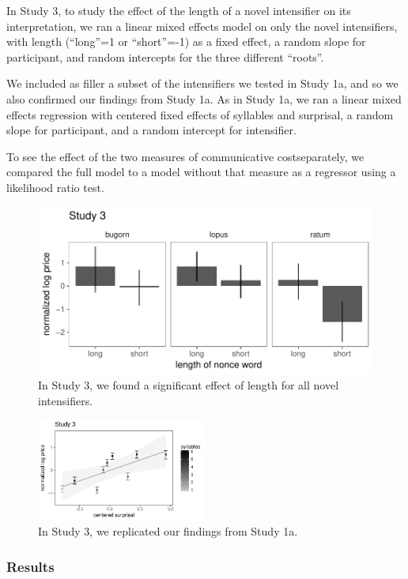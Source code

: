 \documentclass[10pt,letterpaper]{article}
\begin{document}
In Study 3,  to study the effect of the length of a novel intensifier on its interpretation, we ran a linear mixed effects model on only the novel intensifiers, with length (``long''=1 or ``short''=-1) as a fixed effect, a random slope for participant, and random intercepts for the three different ``roots''.

We included as filler a subset of the intensifiers we tested in Study 1a, and so we also confirmed our findings from Study 1a.
As in Study 1a, we ran a linear mixed effects regression with centered fixed effects of syllables and surprisal, a random slope for participant, and a random intercept for intensifier.

To see the effect of the two measures of communicative costseparately, we compared the full model to a model without that measure as a regressor using a likelihood ratio test.

\begin{figure}[hbt]
\begin{center}
\includegraphics[width=.5\textwidth]{images/plot_study3_A.pdf}
\end{center}
\caption{In Study 3, we found a significant effect of length for all novel intensifiers.} 
\label{fig:plot_study3_barplot}
\end{figure}

\begin{figure}[hbt]
\begin{center}
\includegraphics[width=0.5\textwidth]{images/plot_study3_B.pdf}
\end{center}
\caption{In Study 3, we replicated our findings from Study 1a.}
\label{fig:plot_study3_scatter}
\end{figure}

\subsubsection{Results}
\end{document}
